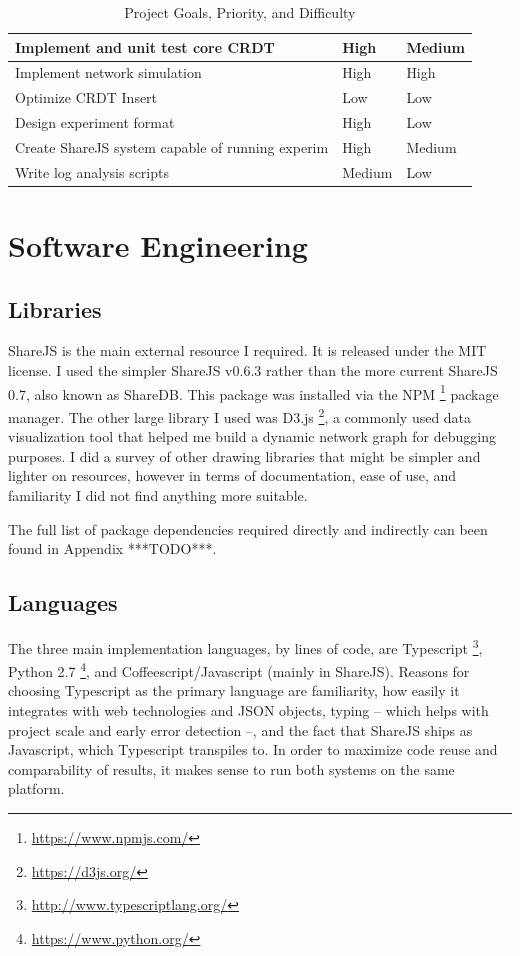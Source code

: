 \documentclass[12pt,a4paper,twoside,openright]{report}
\begin{document}
\begin{center}
\begin{table}
\centering
\caption{Project Goals, Priority, and Difficulty}
\label{my-label}
\begin{tabular}{lll}
\toprule
Implement and unit test core CRDT                & High   & Medium \\ \midrule
Implement network simulation                     & High   & High   \\ \midrule
Optimize CRDT Insert                             & Low    & Low    \\ \midrule
Design experiment format                         & High   & Low    \\ \midrule
Create ShareJS system capable of running experim & High   & Medium \\ \midrule
Write log analysis scripts                       & Medium & Low    \\ \bottomrule
\end{tabular}
\end{table}
\end{center}



\section{Software Engineering}

	\subsection{Libraries}
	ShareJS \cite{sharejs} is the main external resource I required. It is released under the MIT license. I used the simpler ShareJS v0.6.3 rather than the more current ShareJS 0.7, also known as ShareDB. This package was installed via the NPM \footnote{\url{https://www.npmjs.com/}} package manager. The other large library I used was D3.js \footnote{\url{https://d3js.org/}}, a commonly used data visualization tool that helped me build a dynamic network graph for debugging purposes. I did a survey of other drawing libraries that might be simpler and lighter on resources, however in terms of documentation, ease of use, and familiarity I did not find anything more suitable.
	
	The full list of package dependencies required directly and indirectly can been found in Appendix ***TODO***.
	
	\subsection{Languages}
	The three main implementation languages, by lines of code, are Typescript \footnote{\url{http://www.typescriptlang.org/}}, Python 2.7 \footnote{\url{https://www.python.org/}}, and Coffeescript/Javascript  (mainly in ShareJS). Reasons for choosing Typescript as the primary language are familiarity, how easily it integrates with web technologies and JSON objects, typing -- which helps with project scale and early error detection --, and the fact that ShareJS ships as Javascript, which Typescript transpiles to. In order to maximize code reuse and comparability of results, it makes sense to run both systems on the same platform.
	
\end{document}
